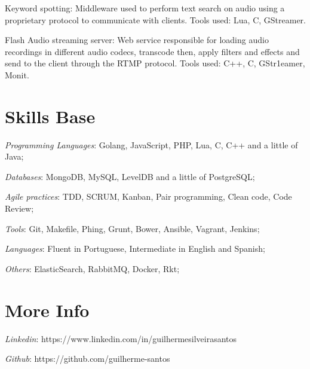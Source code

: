 \documentclass[margin]{res}
\begin{document}
\begin{resume}
Keyword spotting: Middleware used to perform text search on audio using a proprietary protocol to communicate with clients. Tools used: Lua, C, GStreamer.

Flash Audio streaming server: Web service responsible for loading audio recordings in different audio codecs, transcode then, apply filters and effects and send to the client through the RTMP protocol. Tools used: C++, C, GStr1eamer, Monit.

\section{Skills Base} \textit{Programming Languages}: Golang, JavaScript, PHP, Lua, C, C++ and a little of Java;

	\textit{Databases}: MongoDB, MySQL, LevelDB and a little of PostgreSQL;
	
	\textit{Agile practices}: TDD, SCRUM, Kanban, Pair programming, Clean code, Code Review;
	
	\textit{Tools}: Git, Makefile, Phing, Grunt, Bower, Ansible, Vagrant, Jenkins;
	
	\textit{Languages}: Fluent in Portuguese, Intermediate in English and Spanish;
	
	\textit{Others}: ElasticSearch, RabbitMQ, Docker, Rkt;

\section{More Info} \textit{Linkedin}: https://www.linkedin.com/in/guilhermesilveirasantos

    \textit{Github}: https://github.com/guilherme-santos

\end{resume}
\end{document}
